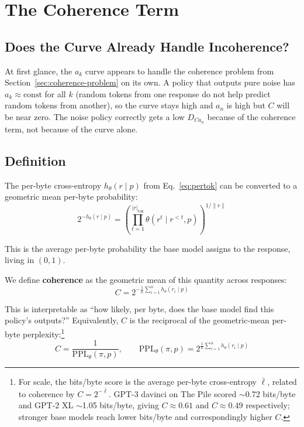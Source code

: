 \section{The Coherence Term}\label{sec:coherence}

\subsection{Does the Curve Already Handle Incoherence?}

At first glance, the $a_k$ curve appears to handle the coherence problem from Section~\ref{sec:coherence-problem} on its own.
A policy that outputs pure noise has $a_k \approx \mathrm{const}$ for all $k$ (random tokens from one response do not help predict random tokens from another), so the curve stays high and $a_n$ is high but $C$ will be near zero.
The noise policy correctly gets a low $D_{Ca_n}$ because of the coherence term, not because of the curve alone.

\subsection{Definition}

The per-byte cross-entropy $h_\theta(r \mid p)$ from Eq.~\eqref{eq:pertok} can be converted to a geometric mean per-byte probability:
\begin{equation}
    2^{-h_\theta(r \mid p)} = \left(\prod_{t=1}^{|r|_{\mathrm{tok}}} \theta(r^t \mid r^{<t}, p)\right)^{1/\|r\|}
\end{equation}

This is the average per-byte probability the base model assigns to the response, living in $(0,1)$.

We define \textbf{coherence} as the geometric mean of this quantity across responses:
\begin{equation}\label{eq:coherence}
    C = 2^{-\frac{1}{n}\sum_{i=1}^{n} h_\theta(r_i \mid p)}
\end{equation}

This is interpretable as ``how likely, per byte, does the base model find this policy's outputs?''
Equivalently, $C$ is the reciprocal of the geometric-mean per-byte perplexity:\footnote{For scale, the bits/byte score is the average per-byte cross-entropy $\bar{\ell}$, related to coherence by $C = 2^{-\bar{\ell}}$. GPT-3 davinci on The Pile \citep{gao2020pile} scored $\sim$0.72 bits/byte and GPT-2 XL $\sim$1.05 bits/byte, giving $C \approx 0.61$ and $C \approx 0.49$ respectively; stronger base models reach lower bits/byte and correspondingly higher $C$.}
\begin{equation}
    C = \frac{1}{\mathrm{PPL}_\theta(\pi, p)}, \qquad \mathrm{PPL}_\theta(\pi, p) = 2^{\frac{1}{n}\sum_{i=1}^{n} h_\theta(r_i \mid p)}
\end{equation}

